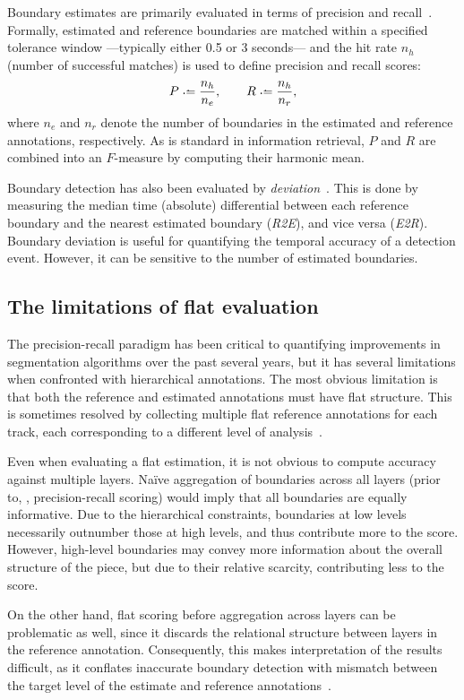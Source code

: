 \documentclass{article}
\begin{document}
Boundary estimates are primarily evaluated in terms of precision and recall~\cite{turnbull2007supervised}.
Formally, estimated and reference boundaries are matched within a specified tolerance window ---typically either 0.5 or 3 seconds--- and the hit rate $n_h$ (number of successful matches) is used to define precision and recall scores:
\begin{equation}
P \defeq \frac{n_h}{n_e}, \quad\quad R \defeq \frac{n_h}{n_r},
\end{equation}
where $n_e$ and $n_r$ denote the number of boundaries in the estimated and reference
annotations, respectively.
As is standard in information retrieval, $P$ and $R$ are combined into an $F$-measure by computing their harmonic mean.

Boundary detection has also been evaluated by \emph{deviation}~\cite{turnbull2007supervised}.
This is done by measuring the median time (absolute) differential between each reference boundary and the nearest estimated boundary (\emph{R2E}), and vice versa (\emph{E2R}).
Boundary deviation is useful for quantifying the temporal accuracy of a detection event.
However, it can be sensitive to the number of estimated boundaries.

\subsection{The limitations of flat evaluation}
The precision-recall paradigm has been critical to quantifying improvements in segmentation algorithms over the past several years, but it has several 
limitations when confronted with hierarchical annotations.
The most obvious limitation is that both the reference and estimated annotations must have flat structure.
This is sometimes resolved by collecting multiple flat reference annotations for each track, 
each corresponding to a different level of analysis~\cite{Smith2011}.

Even when evaluating a flat estimation, it is not obvious to compute accuracy against multiple layers.
Na\"ive aggregation of boundaries across all layers (prior to, \eg, precision-recall scoring) would imply 
that all boundaries are equally informative.
Due to the hierarchical constraints, boundaries at low levels necessarily outnumber those at high levels, and thus contribute more to the score.
However, high-level boundaries may convey more information about the overall structure of the piece, but due to their relative scarcity, contributing less to the score.

On the other hand, flat scoring before aggregation across layers can be problematic as well, 
since it discards the relational structure between layers in the reference annotation.
Consequently, this makes interpretation of the results difficult, as it conflates
inaccurate boundary detection with mismatch between the target level of the estimate and reference
annotations~\cite{Smith2013}.
\end{document}
